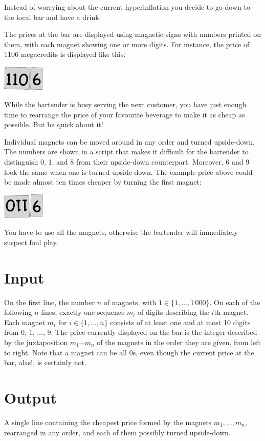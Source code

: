 

Instead of worrying about the current hyperinflation you decide to go down to the local bar and have a drink.

The prices at the bar are displayed using magnetic signs with numbers printed on them, with each magnet showing one or more digits.
For instance, the price of 1106 megacredits is displayed like this:

\medskip
\includegraphics[width = 2cm]{img/from.png}

While the bartender is busy serving the next customer, you have just enough time to rearrange the price of your favourite beverage to make it as cheap as possible.
But be quick about it!

Individual magnets can be moved around in any order and turned upside-down.
The numbers are shown in a script that makes it difficult for the bartender to distinguish 0, 1, and 8 from their upside-down counterpart.
Moreover, 6 and 9 look the same when one is turned upside-down.
The example price above could be made almost ten times cheaper by turning the first magnet:

\medskip
\includegraphics[width = 2cm]{img/to.png}

You have to use all the magnets, otherwise the bartender will immediately suspect foul play.

\section*{Input}

On the first line, the number $n$ of magnets, with $1\in\{1,\ldots, 1\,000\}$.
On each of the following $n$ lines, exactly one sequence $m_i$ of digits describing the $i$th magnet.
Each magnet $m_i$ for $i\in \{1,\ldots, n\}$ consists of at least one and at most 10 digits from $0$, $1$, $\ldots$, $9$.
The price currently displayed on the bar is the integer described by the juxtaposition $m_1\cdots m_n$ of the magnets in the order they are given, from left to right.
Note that a magnet can be all $0$s, even though the current price at the bar, alas!, is certainly not.

\section*{Output}

A single line containing the cheapest price formed by the magnets $m_1,\ldots,m_n$, rearranged in any order, and each of them possibly turned upside-down.
